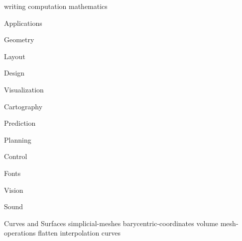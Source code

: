 \def\sharedFolder{../shared/}
{writing}
{computation}
{mathematics}
\begin{plSection}{Applications}
\begin{plSection}{Geometry}
\end{plSection}%
\begin{plSection}{Layout}
\end{plSection}%
\begin{plSection}{Design}
\end{plSection}%
\begin{plSection}{Visualization}
\end{plSection}%
\begin{plSection}{Cartography}
\end{plSection}%
\begin{plSection}{Prediction}
\end{plSection}%
\begin{plSection}{Planning}
\end{plSection}%
\begin{plSection}{Control}
\end{plSection}%
\begin{plSection}{Fonts}
\end{plSection}%
\begin{plSection}{Vision}
\end{plSection}%
\begin{plSection}{Sound}
\end{plSection}%
\begin{plSection}{Curves and Surfaces}
{simplicial-meshes}
{barycentric-coordinates}
{volume}
{mesh-operations}
{flatten}
{interpolation}
{curves}

\end{plSection}
\end{plSection}
